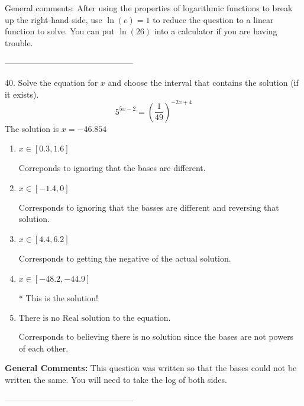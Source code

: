 \documentclass{article}[10pt]
\begin{document}
General comments: After using the properties of logarithmic functions to break up the right-hand side, use $\ln(e) = 1$ to reduce the question to a linear function to solve. You can put $\ln(26)$ into a calculator if you are having trouble.

-----------------------------------------------

40. Solve the equation for $x$ and choose the interval that contains the solution (if it exists).
$$ 5^{5x-2} = \left(\frac{1}{49}\right)^{-2x+4} $$ 
The solution is $ x = -46.854 $ 

\begin{enumerate}[label=\Alph*.] 
\item $ x \in [0.3, 1.6] $ 

  Correponds to ignoring that the bases are different. 
\item $ x \in [-1.4, 0] $ 

  Corresponds to ignoring that the basses are different and reversing that solution. 
\item $ x \in [4.4, 6.2] $ 

  Corresponds to getting the negative of the actual solution. 
\item $ x \in [-48.2, -44.9] $ 

 * This is the solution! 
\item $ \text{There is no Real solution to the equation.} $ 

  Corresponds to believing there is no solution since the bases are not powers of each other. 
\end{enumerate} 
 
\textbf{General Comments:} This question was written so that the bases could not be written the same. You will need to take the log of both sides.

-----------------------------------------------
\end{document}
